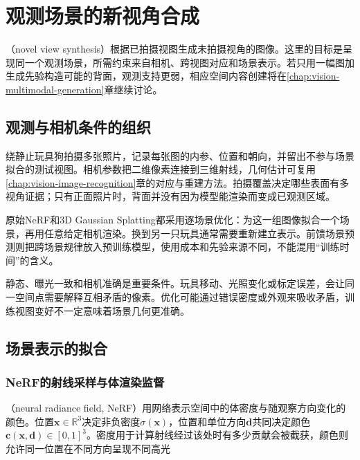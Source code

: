 \section{观测场景的新视角合成}
\label{sec:vision-generation-novel-view}

（novel view synthesis）根据已拍摄视图生成未拍摄视角的图像。这里的目标是呈现同一个观测场景，所需约束来自相机、跨视图对应和场景表示。若只用一幅图加生成先验构造可能的背面，观测支持更弱，相应空间内容创建将在\ref{chap:vision-multimodal-generation}章继续讨论。

\subsection{观测与相机条件的组织}
\label{sec:vision-generation-cameras}

绕静止玩具狗拍摄多张照片，记录每张图的内参、位置和朝向，并留出不参与场景拟合的测试视图。相机参数把二维像素连接到三维射线，几何估计可复用\ref{chap:vision-image-recognition}章的对应与重建方法。拍摄覆盖决定哪些表面有多视角证据；只有正面照片时，背面并没有因为模型能渲染而变成已观测区域。

原始NeRF和3D Gaussian Splatting都采用逐场景优化：为这一组图像拟合一个场景，再用任意给定相机渲染。换到另一只玩具通常需要重新建立表示。前馈场景预测则把跨场景规律放入预训练模型，使用成本和先验来源不同，不能混用“训练时间”的含义。

静态、曝光一致和相机准确是重要条件。玩具移动、光照变化或标定误差，会让同一空间点需要解释互相矛盾的像素。优化可能通过错误密度或外观来吸收矛盾，训练视图变好不一定意味着场景几何更准确。

\subsection{场景表示的拟合}
\label{sec:vision-generation-scene-fitting}

\Needspace{65mm}
\subsubsection{NeRF的射线采样与体渲染监督}
\label{sec:vision-generation-nerf}

（neural radiance field, NeRF）用网络表示空间中的体密度与随观察方向变化的颜色。位置$\bm{x}\in\mathbb{R}^3$决定非负密度$\sigma(\bm{x})$，位置和单位方向$\bm{d}$共同决定颜色$\bm{c}(\bm{x},\bm{d})\in[0,1]^3$。密度用于计算射线经过该处时有多少贡献会被截获，颜色则允许同一位置在不同方向呈现不同高光

